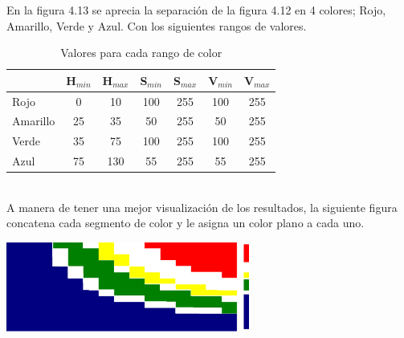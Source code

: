 En la figura 4.13 se aprecia la separación de la figura 4.12 en 4 colores; Rojo, Amarillo, Verde y Azul.
Con los siguientes rangos de valores.\\
\begin{table}[ht]
	\begin{center}
		\caption{Valores para cada rango de color}
		\begin{tabular}[t]{lcccccc}
			\hline
			         & H$_{min}$ & H$_{max}$ & S$_{min}$ & S$_{max}$ & V$_{min}$ & V$_{max}$ \\
			\hline
			Rojo     & 0         & 10        & 100       & 255       & 100       & 255       \\
			Amarillo & 25        & 35        & 50        & 255       & 50        & 255       \\
			Verde    & 35        & 75        & 100       & 255       & 100       & 255       \\
			Azul     & 75        & 130       & 55        & 255       & 55        & 255       \\
			\hline
		\end{tabular}
	\end{center}
\end{table}\\
A manera de tener una mejor visualización de los resultados, la siguiente figura concatena
cada segmento de color y le asigna un color plano a cada uno.
\begin{center}
	\includegraphics[width=0.6\textwidth]{Contenido/Cuerpo/Capitulo4/Fig6.eps}
	\label{Fig6}
\end{center}

